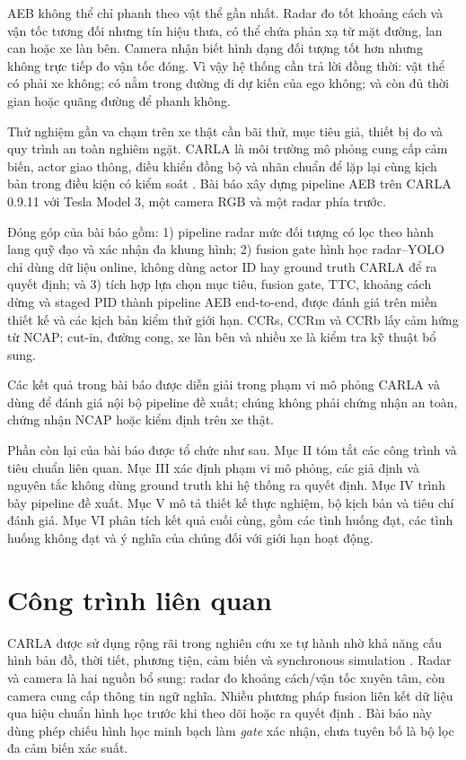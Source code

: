 \documentclass[conference]{IEEEtran}
\begin{document}
AEB không thể chỉ phanh theo vật thể gần nhất. Radar đo tốt khoảng cách và vận tốc tương đối nhưng tín hiệu thưa, có thể chứa phản xạ từ mặt đường, lan can hoặc xe làn bên. Camera nhận biết hình dạng đối tượng tốt hơn nhưng không trực tiếp đo vận tốc đóng. Vì vậy hệ thống cần trả lời đồng thời: vật thể có phải xe không; có nằm trong đường đi dự kiến của ego không; và còn đủ thời gian hoặc quãng đường để phanh không.

Thử nghiệm gần va chạm trên xe thật cần bãi thử, mục tiêu giả, thiết bị đo và quy trình an toàn nghiêm ngặt. CARLA là môi trường mô phỏng cung cấp cảm biến, actor giao thông, điều khiển đồng bộ và nhãn chuẩn để lặp lại cùng kịch bản trong điều kiện có kiểm soát \cite{dosovitskiy2017carla,carla_docs}. Bài báo xây dựng pipeline AEB trên CARLA 0.9.11 với Tesla Model 3, một camera RGB và một radar phía trước.

Đóng góp của bài báo gồm: 1) pipeline radar mức đối tượng có lọc theo hành lang quỹ đạo và xác nhận đa khung hình; 2) fusion gate hình học radar--YOLO chỉ dùng dữ liệu online, không dùng actor ID hay ground truth CARLA để ra quyết định; và 3) tích hợp lựa chọn mục tiêu, fusion gate, TTC, khoảng cách dừng và staged PID thành pipeline AEB end-to-end, được đánh giá trên miền thiết kế và các kịch bản kiểm thử giới hạn. CCRs, CCRm và CCRb lấy cảm hứng từ NCAP; cut-in, đường cong, xe làn bên và nhiều xe là kiểm tra kỹ thuật bổ sung.

Các kết quả trong bài báo được diễn giải trong phạm vi mô phỏng CARLA và dùng để đánh giá nội bộ pipeline đề xuất; chúng không phải chứng nhận an toàn, chứng nhận NCAP hoặc kiểm định trên xe thật.

Phần còn lại của bài báo được tổ chức như sau. Mục II tóm tắt các công trình và tiêu chuẩn liên quan. Mục III xác định phạm vi mô phỏng, các giả định và nguyên tắc không dùng ground truth khi hệ thống ra quyết định. Mục IV trình bày pipeline đề xuất. Mục V mô tả thiết kế thực nghiệm, bộ kịch bản và tiêu chí đánh giá. Mục VI phân tích kết quả cuối cùng, gồm các tình huống đạt, các tình huống không đạt và ý nghĩa của chúng đối với giới hạn hoạt động.

\section{Công trình liên quan}
CARLA được sử dụng rộng rãi trong nghiên cứu xe tự hành nhờ khả năng cấu hình bản đồ, thời tiết, phương tiện, cảm biến và synchronous simulation \cite{dosovitskiy2017carla,carla_sensors}. Radar và camera là hai nguồn bổ sung: radar đo khoảng cách/vận tốc xuyên tâm, còn camera cung cấp thông tin ngữ nghĩa. Nhiều phương pháp fusion liên kết dữ liệu qua hiệu chuẩn hình học trước khi theo dõi hoặc ra quyết định \cite{feng2021multimodal}. Bài báo này dùng phép chiếu hình học minh bạch làm \textit{gate} xác nhận, chưa tuyên bố là bộ lọc đa cảm biến xác suất.
\end{document}
